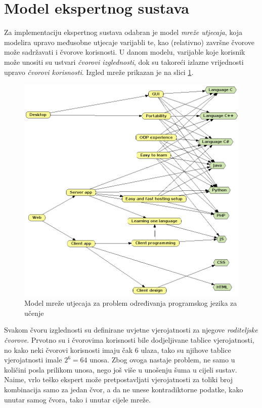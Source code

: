 \documentclass{article}
\begin{document}
	\section{Model ekspertnog sustava}
	Za implementaciju ekspertnog sustava odabran je model \textit{mreže utjecaja\textit{}}, koja modelira upravo međusobne utjecaje varijabli te, kao (relativno) završne čvorove može sadržavati i čvorove korisnosti. U danom modelu, varijable koje korisnik može unositi su ustvari \textit{čvorovi izglednosti}, dok su takoreći izlazne vrijednosti upravo \textit{čvorovi korisnosti}. Izgled mreže prikazan je na slici \ref{fig:mreza}.
	
	\begin{figure}
		\centering
		\includegraphics[width=0.9\linewidth]{img/mreza}
		\caption[Model mreže utjecaja]{Model mreže utjecaja za problem određivanja programskog jezika za učenje}
		\label{fig:mreza}
	\end{figure}
	
	Svakom čvoru izglednosti su definirane uvjetne vjerojatnosti za njegove \textit{roditeljske čvorove}. Prvotno su i čvorovima korisnosti bile dodjeljivane tablice vjerojatnosti, no kako neki čvorovi korisnosti imaju čak 6 ulaza, tako su njihove tablice vjerojatnosti imale $ 2^6=64 $ unosa. Zbog ovoga nastaje problem, ne samo u količini posla prilikom unosa, nego još više u unošenju šuma u cijeli sustav. Naime, vrlo teško ekspert može pretpostavljati vjerojatnosti za toliki broj kombinacija samo za jedan čvor, a da ne unese kontradiktorne podatke, kako unutar samog čvora, tako i unutar cijele mreže.
	
\end{document}
